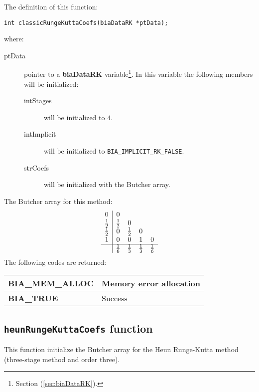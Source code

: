 The definition of this function:
%
\begin{verbatim}
int classicRungeKuttaCoefs(biaDataRK *ptData);
\end{verbatim} 
%
where:
%
\begin{description}
\item[ptData] pointer to a \textbf{biaDataRK} variable\footnote{Section (\ref{sec:biaDataRK}).}. In this variable the following members will be initialized:
%
\begin{description}
%    
\item[intStages] will be initialized to $4$.
%  
\item[intImplicit] will be initialized to \texttt{BIA\_IMPLICIT\_RK\_FALSE}.
%
\item[strCoefs] will be initialized with the Butcher array.
%  
\end{description}
%  
\end{description}
%
The Butcher array for this method:
%
\begin{displaymath}
\begin{array}{c|cccc}
0 & 0 \\
\frac{1}{2} & \frac{1}{2} & 0 \\
\frac{1}{2} & 0 & \frac{1}{2} & 0 \\
1 & 0 & 0 & 1 & 0 \\
\hline
 & \frac{1}{6} & \frac{1}{3} & \frac{1}{3} & \frac{1}{6} \\
\end{array}
\end{displaymath}
%
The following codes are returned:
%
\begin{center}
\begin{tabular}{|l|l|}
\hline
\textbf{BIA\_MEM\_ALLOC} & Memory error allocation \\
\hline
\textbf{BIA\_TRUE} & Success \\
\hline
\end{tabular}
\end{center}

\subsection{\texttt{heunRungeKuttaCoefs} function}

This function initialize the Butcher array for the Heun Runge-Kutta method (three-stage method and order three).\\

